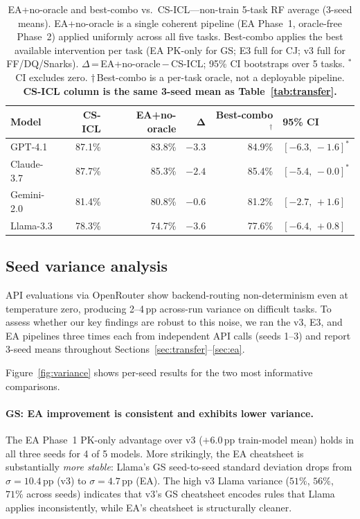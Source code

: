 \documentclass{article}
\begin{document}
\begin{table}[t]
  \caption{EA+no-oracle and best-combo vs.\ CS-ICL---non-train 5-task RF average (3-seed means).
    EA+no-oracle is a single coherent pipeline (EA Phase~1, oracle-free Phase~2) applied
    uniformly across all five tasks.
    Best-combo applies the best available intervention per task (EA PK-only for GS;
    E3 full for CJ; v3 full for FF/DQ/Snarks).
    $\Delta$\,=\,EA+no-oracle\,$-$\,CS-ICL; 95\% CI bootstraps over 5 tasks.
    $^{*}$\,CI excludes zero. $\dagger$\,Best-combo is a per-task oracle, not a deployable pipeline.
    \textbf{CS-ICL column is the same 3-seed mean as Table~\ref{tab:transfer}.}}
  \label{tab:combined}
  \centering
  \smallskip
  \begin{tabular}{lrrrrl}
    \toprule
    \textbf{Model} & \textbf{CS-ICL} & \textbf{EA+no-oracle} & $\boldsymbol{\Delta}$ & \textbf{Best-combo$^\dagger$} & \textbf{95\% CI} \\
    \midrule
    GPT-4.1    & 87.1\% & 83.8\% & $-3.3$ & 84.9\% & $[-6.3,\,-1.6]^{*}$ \\
    Claude-3.7 & 87.7\% & 85.3\% & $-2.4$ & 85.4\% & $[-5.4,\,-0.0]^{*}$ \\
    Gemini-2.0 & 81.4\% & 80.8\% & $-0.6$ & 81.2\% & $[-2.7,\,+1.6]$ \\
    Llama-3.3  & 78.3\% & 74.7\% & $-3.6$ & 77.6\% & $[-6.4,\,+0.8]$ \\
    \bottomrule
  \end{tabular}
\end{table}

\subsection{Seed variance analysis}
\label{sec:variance}

API evaluations via OpenRouter show backend-routing non-determinism even at temperature zero,
producing 2--4\,pp across-run variance on difficult tasks.
To assess whether our key findings are robust to this noise, we ran the v3, E3, and EA
pipelines three times each from independent API calls (seeds 1--3) and report 3-seed means
throughout Sections~\ref{sec:transfer}--\ref{sec:ea}.

Figure~\ref{fig:variance} shows per-seed results for the two most informative comparisons.

\paragraph{GS: EA improvement is consistent and exhibits lower variance.}
The EA Phase~1 PK-only advantage over v3 ($+6.0$\,pp train-model mean) holds in all three
seeds for 4 of 5 models.
More strikingly, the EA cheatsheet is substantially \emph{more stable}: Llama's GS seed-to-seed
standard deviation drops from $\sigma=10.4$\,pp (v3) to $\sigma=4.7$\,pp (EA).
The high v3 Llama variance ($51\%$, $56\%$, $71\%$ across seeds) indicates that v3's GS
cheatsheet encodes rules that Llama applies inconsistently, while EA's cheatsheet is
structurally cleaner.
\end{document}
